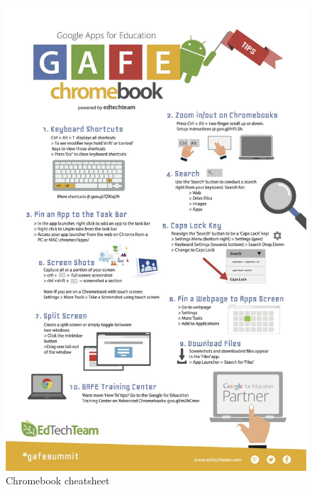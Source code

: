 \documentclass[]{book}
\begin{document}
\begin{figure}
\centering
\includegraphics{./files/00_chromebook_cheatsheet.jpeg}
\caption{Chromebook cheatsheet}
\end{figure}
\end{document}
